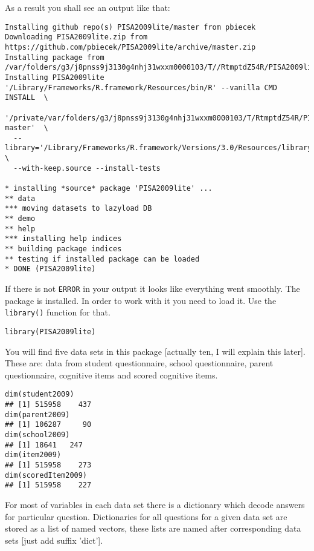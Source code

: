 As a result you shall see an output like that:
\begin{shaded}\begin{verbatim}
Installing github repo(s) PISA2009lite/master from pbiecek
Downloading PISA2009lite.zip from https://github.com/pbiecek/PISA2009lite/archive/master.zip
Installing package from /var/folders/g3/j8pnss9j3130g4nhj31wxxm0000103/T//RtmptdZ54R/PISA2009lite.zip
Installing PISA2009lite
'/Library/Frameworks/R.framework/Resources/bin/R' --vanilla CMD INSTALL  \
  '/private/var/folders/g3/j8pnss9j3130g4nhj31wxxm0000103/T/RtmptdZ54R/PISA2009lite-master'  \
  --library='/Library/Frameworks/R.framework/Versions/3.0/Resources/library'  \
  --with-keep.source --install-tests 

* installing *source* package 'PISA2009lite' ...
** data
*** moving datasets to lazyload DB
** demo
** help
*** installing help indices
** building package indices
** testing if installed package can be loaded
* DONE (PISA2009lite)
\end{verbatim}\end{shaded}

If there is not \verb:ERROR: in your output it looks like everything went smoothly. The package is installed. In order to work with it you need to load it. Use the \verb:library(): function for that.
\begin{shaded}\begin{verbatim}
library(PISA2009lite)
\end{verbatim}\end{shaded}

You will find five data sets in this package [actually ten, I will explain this later]. These are: data from student questionnaire, school questionnaire, parent questionnaire, cognitive items and scored cognitive items.

\begin{shaded}\begin{verbatim}
dim(student2009)
## [1] 515958    437
dim(parent2009)
## [1] 106287     90
dim(school2009)
## [1] 18641   247
dim(item2009)
## [1] 515958    273
dim(scoredItem2009)
## [1] 515958    227
\end{verbatim}\end{shaded}

For most of variables in each data set there is a dictionary which decode answers for particular question. Dictionaries for all questions for a given data set are stored as a list of named vectors, these lists are named after corresponding data sets [just add suffix 'dict'].

